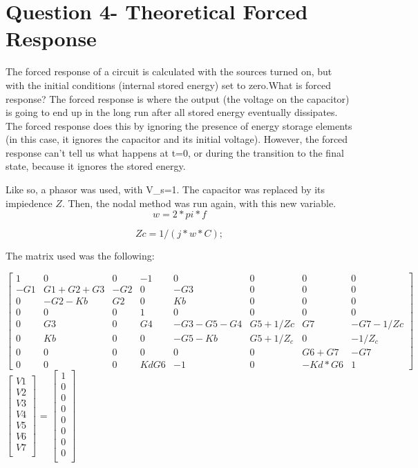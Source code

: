 \section{Question 4- Theoretical Forced Response}
The forced response of a circuit is calculated with the sources turned on, but with the initial conditions (internal stored energy) set to zero.What is forced response? The forced response is where the output (the voltage on the capacitor) is going to end up in the long run after all stored energy eventually dissipates. The forced response does this by ignoring the presence of energy storage elements (in this case, it ignores the capacitor and its initial voltage). However, the forced response can't tell us what happens at t=0, or during the transition to the final state, because it ignores the stored energy. 
\par Like so, a phasor was used, with V_{s}=1. The capacitor was replaced by its impiedence $Z$. Then, the nodal method was run again, with this new variable.
\begin{equation}
w=2*pi*f
\end{equation} 

\begin{equation}
Zc=1/(j*w*C);
\end{equation} 

\par The matrix used was the following:

$\begin{bmatrix}
1 & 0 & 0 & -1 & 0 & 0 & 0 & 0 \\
-G1 & G1+G2+G3 & -G2 & 0 & -G3 & 0 & 0 & 0 \\
0 & -G2-Kb & G2 & 0 & Kb & 0 & 0 & 0 \\
0 & 0 & 0 & 1 & 0 & 0 & 0 & 0 \\
0 & G3 & 0 & G4 &-G3-G5-G4 & G5+1/Zc & G7 & -G7-1/Zc\\
0 & Kb & 0 & 0 & -G5-Kb & G5+1/Z_{c} & 0 & -1/Z_{c} \\
0 & 0 & 0 & 0 & 0 & 0 & G6+G7& -G7 \\
0 & 0 & 0 & KdG6 & -1 & 0 & -Kd*G6 & 1
\end{bmatrix}$
$\begin{bmatrix}
V1 \\ V2 \\ V3 \\ V4 \\ V5 \\ V6 \\ V7 \\ 
\end{bmatrix}$
= 
$\begin{bmatrix}
1 \\ 0 \\ 0 \\ 0 \\ 0 \\ 0 \\ 0 \\ 0 \\ 
\end{bmatrix}$

